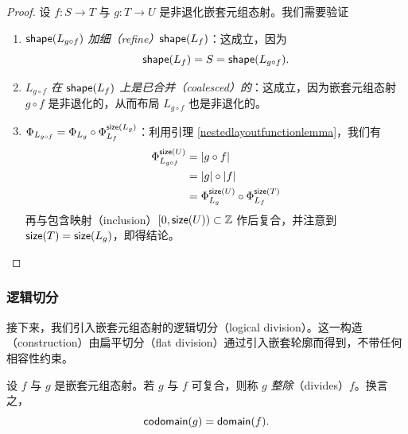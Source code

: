 \begin{proof}
    设 $f:S \to T$ 与 $g: T \to U$ 是非退化嵌套元组态射。我们需要验证
    \begin{enumerate}
        \item {\it $\mathsf{shape}(L_{g \circ f})$ 加细（refine）$\mathsf{shape}(L_{f})$}：这成立，因为
        \[\mathsf{shape}(L_f) = S = \mathsf{shape}(L_{g \circ f}).\]
        \item {\it $L_{g \circ f}$ 在 $\mathsf{shape}(L_{f})$ 上是已合并（coalesced）的}：这成立，因为嵌套元组态射 $g \circ f$ 是非退化的，从而布局 $L_{g \circ f}$ 也是非退化的。
        \item {\it $\Phi_{L_{g \circ f}} = \Phi_{L_{g}} \circ \Phi_{L_{f}}^{\mathsf{size}(L_{g})}$}：利用引理 \ref{nestedlayoutfunctionlemma}，我们有
        \begin{align*}
        \Phi_{L_{g \circ f}}^{\mathsf{size}(U)} &  = |g \circ f| \\
        &  = |g| \circ |f| \\
        & = \Phi_{L_g}^{\mathsf{size}(U)} \circ \Phi_{L_f}^{\mathsf{size}(T)}\\
        \end{align*}
        再与包含映射（inclusion）$[0,\mathsf{size}(U)) \subset \mathbb{Z}$ 作后复合，并注意到 $\mathsf{size}(T) = \mathsf{size}(L_{g})$，即得结论。
    \end{enumerate}
\end{proof}







\subsubsection{逻辑切分}

接下来，我们引入嵌套元组态射的逻辑切分（logical division）。这一构造（construction）由扁平切分（flat division）通过引入嵌套轮廓而得到，不带任何相容性约束。


\begin{definition}
     设 $f$ 与 $g$ 是嵌套元组态射。若 $g$ 与 $f$ 可复合，则称 $g$ {\it 整除}（divides）$f$。换言之，
     \[
     \mathsf{codomain}(g) = \mathsf{domain}(f).
     \]
\end{definition}


